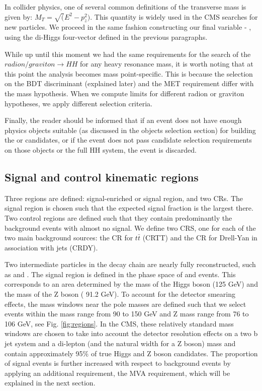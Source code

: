 \begin{small}
In collider physics, one of several common definitions of the transverse mass is given by: $M_T=\sqrt( E^2- p_z^2)$. This quantity is widely used in the CMS searches for new particles. We proceed in the same fashion constructing our final variable - \mTHH, using the di-Higgs four-vector defined in the previous paragraphs. 

While up until this moment we had the same requirements for the search of the $radion/graviton \to HH$ for any heavy resonance mass, it is worth noting that at this point the analysis becomes mass point-specific. This is because the selection on the BDT discriminant (explained later) and the MET requirement differ with the mass hypothesis. When we compute limits for different radion or graviton hypotheses, we apply different selection criteria. 

Finally, the reader should be informed that if an event does not have enough physics objects suitable (as discussed in the objects selection section) for building the \Zll or \HBB candidates, or if the event does not pass candidate selection requirements on those objects or the full HH system, the event is discarded.

\subsection{Signal and control kinematic regions}

Three regions are defined: signal-enriched or signal region, and two CRs. The signal region is chosen such that the expected signal fraction is the largest there. Two control regions are defined such that they contain predominantly the background events with almost no signal. We define two CRS, one for each of the two main background sources: the CR for $t\bar{t}$ (CRTT) and the CR for Drell-Yan in association with jets (CRDY).

Two intermediate particles in the decay chain are nearly fully reconstructed, such as \HBB and \Zll. The signal region is defined in the phase space of \HBB and \Zll events. This corresponds to an area determined by the mass of the Higgs boson (125 GeV) and the mass of the Z boson ( 91.2 GeV). To account for the detector smearing effects, the mass windows near the pole masses are defined such that we select events within the \HBB mass range from 90 to 150 GeV and Z mass range from 76 to 106 GeV, see Fig. \ref{fig:regions}. In the CMS, these relatively standard mass windows are chosen to take into account the detector resolution effects on a two b jet system and a di-lepton (and the natural width for a Z boson) mass and contain approximately 95$\%$ of true Higgs and Z boson candidates. The proportion of signal events is further increased with respect to background events by applying an additional requirement, the MVA requirement, which will be explained in the next section.


\end{small}
